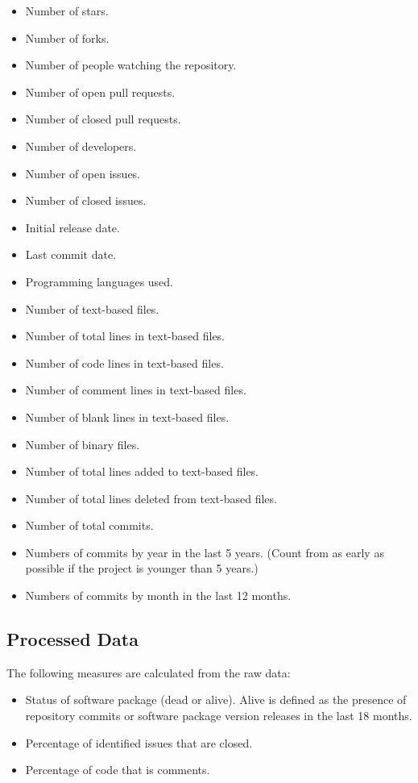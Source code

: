 \documentclass[letterpaper,cleveref]{lipics-v2019}
\theoremstyle{definition}
\begin{document}
\begin{itemize}
\item Number of stars.
\item Number of forks.
\item Number of people watching the repository.
\item Number of open pull requests.
\item Number of closed pull requests.	
\item Number of developers.	
\item Number of open issues.
\item Number of closed issues.
\item Initial release date.
\item Last commit date.
\item Programming languages used.
\item Number of text-based files.
\item Number of total lines in text-based files.
\item Number of code lines in text-based files.
\item Number of comment lines in text-based files.
\item Number of blank lines in text-based files.
\item Number of binary files.  
\item Number of total lines added to text-based files.
\item Number of total lines deleted from text-based files.
\item Number of total commits.
\item Numbers of commits by year in the last 5 years. (Count from as early as possible if the project is younger than 5 years.) 
\item Numbers of commits by month in the last 12 months.
\end{itemize}


\subsection{Processed Data}\label{processeddata}
The following measures are calculated from the raw data:

\begin{itemize}
\item Status of software package (dead or alive). Alive is defined as the presence of repository commits or software package version releases in the last 18 months.
\item Percentage of identified issues that are closed.
\item Percentage of code that is comments.
\end{itemize}
\end{document}
